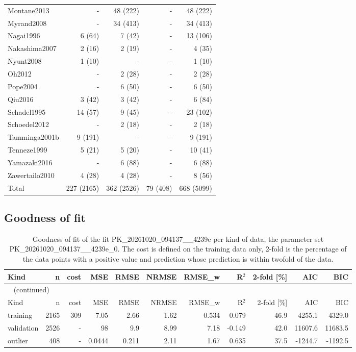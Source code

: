 \documentclass{article}
\begin{document}
\begin{longtable}{lrrrr}
Montane2013 & - & 48 (222) & - & 48 (222) \\
Myrand2008 & - & 34 (413) & - & 34 (413) \\
Nagai1996 & 6 (64) & 7 (42) & - & 13 (106) \\
Nakashima2007 & 2 (16) & 2 (19) & - & 4 (35) \\
Nyunt2008 & 1 (10) & - & - & 1 (10) \\
Oh2012 & - & 2 (28) & - & 2 (28) \\
Pope2004 & - & 6 (50) & - & 6 (50) \\
Qiu2016 & 3 (42) & 3 (42) & - & 6 (84) \\
Schadel1995 & 14 (57) & 9 (45) & - & 23 (102) \\
Schoedel2012 & - & 2 (18) & - & 2 (18) \\
Tamminga2001b & 9 (191) & - & - & 9 (191) \\
Tenneze1999 & 5 (21) & 5 (20) & - & 10 (41) \\
Yamazaki2016 & - & 6 (88) & - & 6 (88) \\
Zawertailo2010 & 4 (28) & 4 (28) & - & 8 (56) \\
Total & 227 (2165) & 362 (2526) & 79 (408) & 668 (5099) \\
\end{longtable}

\subsection{Goodness of fit}

\begin{longtable}{lrrrrrrrrrr}
\caption{Goodness of fit of the fit PK\_20261020\_094137\_\_4239e per kind of data, the parameter set PK\_20261020\_094137\_\_4239e\_0. The cost is defined on the training data only, 2-fold is the percentage of the data points with a positive value and prediction whose prediction is within twofold of the data.}\label{tab:metrics:PK_20261020_094137__4239e} \\
\toprule
Kind & n & cost & MSE & RMSE & NRMSE & RMSE\_w & R\ensuremath{^{2}} & 2-fold [\%] & AIC & BIC \\
\midrule
\endfirsthead
\multicolumn{11}{l}{\small\tablename~\thetable{} (continued)} \\
\toprule
Kind & n & cost & MSE & RMSE & NRMSE & RMSE\_w & R\ensuremath{^{2}} & 2-fold [\%] & AIC & BIC \\
\midrule
\endhead
\bottomrule
\endlastfoot
training & 2165 & 309 & 7.05 & 2.66 & 1.62 & 0.534 & 0.079 & 46.9 & 4255.1 & 4329.0 \\
validation & 2526 & - & 98 & 9.9 & 8.99 & 7.18 & -0.149 & 42.0 & 11607.6 & 11683.5 \\
outlier & 408 & - & 0.0444 & 0.211 & 2.11 & 1.67 & 0.635 & 37.5 & -1244.7 & -1192.5 \\
\end{longtable}
\end{document}
